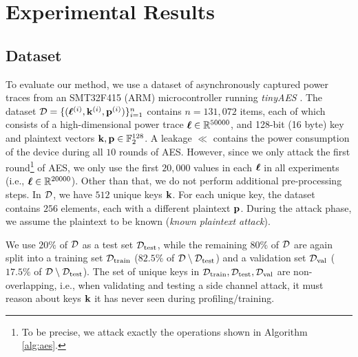 \chapter{Experimental Results}
\label{cha:experimental_results}

\section{Dataset}
To evaluate our method, we use a dataset of asynchronously captured power traces from an SMT32F415 (ARM) microcontroller \cite{dlsca_defcon} running \textit{tinyAES} \cite{tinyaes}. The dataset $\mathcal{D} = \{(\boldsymbol{\ell}^{(i)}, \mathbf{k}^{(i)}, \mathbf{p}^{(i)})\}_{i=1}^n$ contains $n = 131,072$ items, each of which consists of a high-dimensional power trace $\boldsymbol{\ell} \in \mathbb{R}^{50000}$, and 128-bit (16 byte) key and plaintext vectors $\mathbf{k}, \mathbf{p} \in \mathbb{F}_2^{128}$. A leakage $\ll$ contains the power consumption of the device during all $10$ rounds of AES. However, since we only attack the first round\footnote{To be precise, we attack exactly the operations shown in Algorithm \ref{alg:aes}.} of AES, we only use the first $20,000$ values in each $\boldsymbol{\ell}$ in all experiments (i.e., $\boldsymbol{\ell} \in \mathbb{R}^{20000}$). Other than that, we do not perform additional pre-processing steps.
In $\mathcal{D}$, we have $512$ unique keys $\mathbf{k}$. For each unique key, the dataset contains $256$ elements, each with a different plaintext $\mathbf{p}$. During the attack phase, we assume the plaintext to be known (\textit{known plaintext attack}).

We use $20\%$ of $\mathcal{D}$ as a test set $\mathcal{D}_{\text{test}}$, while the remaining $80\%$ of $\mathcal{D}$ are again split into a training set $\mathcal{D}_{\text{train}}$ ($82.5\%$ of $\mathcal{D} \setminus \mathcal{D}_{\text{test}}$) and a validation set $\mathcal{D}_{\text{val}}$ ($17.5\%$ of $\mathcal{D} \setminus \mathcal{D}_{\text{test}}$).
The set of unique keys in $\mathcal{D}_{\text{train}}, \mathcal{D}_{\text{test}}, \mathcal{D}_{\text{val}}$ are non-overlapping, i.e., when validating and testing a side channel attack, it must reason about keys $\mathbf{k}$ it has never seen during profiling/training.


